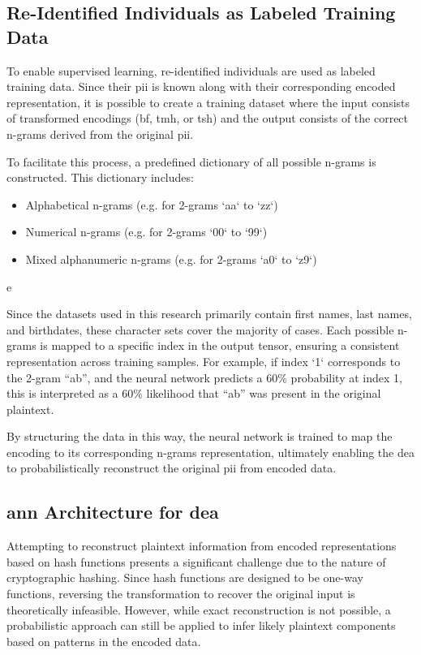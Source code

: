 \subsection{Re-Identified Individuals as Labeled Training Data}

To enable supervised learning, re-identified individuals are used as labeled training data.
Since their \ac{pii} is known along with their corresponding encoded representation, it is possible to create a training dataset where the input consists of transformed encodings (\ac{bf}, \ac{tmh}, or \ac{tsh}) and the output consists of the correct n-grams derived from the original \ac{pii}.

To facilitate this process, a predefined dictionary of all possible n-grams is constructed. This dictionary includes:
\begin{itemize}
   \item Alphabetical n-grams (e.g. for 2-grams `aa` to `zz`)
   \item Numerical n-grams (e.g. for 2-grams `00` to `99`)
   \item Mixed alphanumeric n-grams (e.g. for 2-grams `a0` to `z9`)
\end{itemize}e

Since the datasets used in this research primarily contain first names, last names, and birthdates, these character sets cover the majority of cases.
Each possible n-grams is mapped to a specific index in the output tensor, ensuring a consistent representation across training samples.
For example, if index `1` corresponds to the 2-gram \enquote{ab}, and the neural network predicts a 60\% probability at index 1, this is interpreted as a 60\% likelihood that \enquote{ab} was present in the original plaintext.

By structuring the data in this way, the neural network is trained to map the encoding to its corresponding n-grams representation, ultimately enabling the \ac{dea} to probabilistically reconstruct the original \ac{pii} from encoded data.

\subsection{\ac{ann} Architecture for \ac{dea}} \label{sec:architecture}

Attempting to reconstruct plaintext information from encoded representations based on hash functions presents a significant challenge due to the nature of cryptographic hashing.
Since hash functions are designed to be one-way functions, reversing the transformation to recover the original input is theoretically infeasible.
However, while exact reconstruction is not possible, a probabilistic approach can still be applied to infer likely plaintext components based on patterns in the encoded data.

